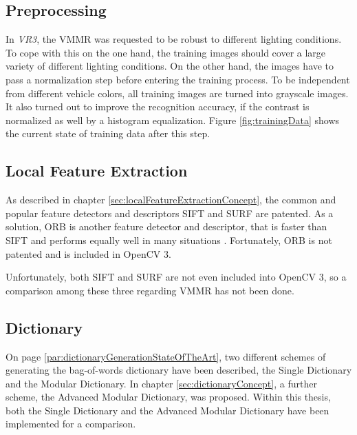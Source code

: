 
\subsection{Preprocessing}\label{sec:preprocessingImpl}
In \emph{VR3}, the VMMR was requested to be robust to different lighting conditions. To cope with this on the one hand, the training images should cover a large variety of different lighting conditions. On the other hand, the images have to pass a normalization step before entering the training process. To be independent from different vehicle colors, all training images are turned into grayscale images. It also turned out to improve the recognition accuracy, if the contrast is normalized as well by a histogram equalization. Figure \ref{fig:trainingData} shows the current state of training data after this step.

\subsection{Local Feature Extraction}\label{sec:localFeatureExtractionImpl}
As described in chapter \ref{sec:localFeatureExtractionConcept}, the common and popular feature detectors and descriptors SIFT and SURF are patented. As a solution, ORB is another feature detector and descriptor, that is faster than SIFT and performs equally well in many situations \citep{rublee2011orb}. Fortunately, ORB is not patented and is included in OpenCV 3.

Unfortunately, both SIFT and SURF are not even included into OpenCV 3, so a comparison among these three regarding VMMR has not been done.

\subsection{Dictionary}\label{sec:dictionaryImpl}
On page \ref{par:dictionaryGenerationStateOfTheArt}, two different schemes of generating the bag-of-words dictionary have been described, the Single Dictionary and the Modular Dictionary. In chapter \ref{sec:dictionaryConcept}, a further scheme, the Advanced Modular Dictionary, was proposed. Within this thesis, both the Single Dictionary and the Advanced Modular Dictionary have been implemented for a comparison.

